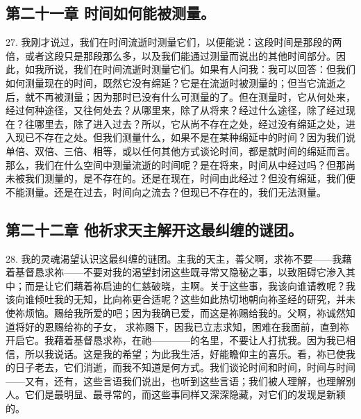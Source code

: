 
\subsection{第二十一章 时间如何能被测量。}

27. 我刚才说过，我们在时间流逝时测量它们，以便能说：这段时间是那段的两倍，或者这段只是那段那么多，以及我们能通过测量而说出的其他时间部分。因此，如我所说，我们在时间流逝时测量它们。如果有人问我：我可以回答：但我们如何测量现在的时间，既然它没有绵延？它是在流逝时被测量的；但当它流逝之后，就不再被测量；因为那时已没有什么可测量的了。但在测量时，它从何处来，经过何种途径，又往何处去？从哪里来，除了从将来？经过什么途径，除了经过现在？往哪里去，除了进入过去？所以，它从尚不存在之处，经过没有绵延之处，进入现已不存在之处。但我们测量什么，如果不是在某种绵延中的时间？因为我们说单倍、双倍、三倍、相等，或以任何其他方式谈论时间，都是就时间的绵延而言。那么，我们在什么空间中测量流逝的时间呢？是在将来，时间从中经过吗？但那尚未被我们测量的，是不存在的。还是在现在，时间由此经过？但没有绵延，我们便不能测量。还是在过去，时间向之流去？但现已不存在的，我们无法测量。\par


\subsection{第二十二章 他祈求天主解开这最纠缠的谜团。}

28. 我的灵魂渴望认识这最纠缠的谜团。主我的天主，善父啊，求祢不要——我藉着基督恳求祢——不要对我的渴望封闭这些既寻常又隐秘之事，以致阻碍它渗入其中；而是让它们藉着祢启迪的仁慈破晓，主啊。关于这些事，我该向谁请教呢？我该向谁倾吐我的无知，比向祢更合适呢？这些如此热切地朝向祢圣经的研究，并未使祢烦恼。赐给我所爱的吧；因为我确已爱，而这是祢赐给我的。父啊，祢诚然知道将好的恩赐给祢的子女， 求祢赐下，因我已立志求知，困难在我面前，直到祢开启它。我藉着基督恳求祢，在祂————的名里，不要让人打扰我。因为我已相信，所以我说话。这是我的希望；为此我生活，好能瞻仰主的喜乐。看，祢已使我的日子老去，它们消逝，而我不知道是何方式。我们谈论时间和时间，时间与时间——又有，还有，这些言语我们说出，也听到这些言语；我们被人理解，也理解别人。它们是最明显、最寻常的，而这些事同样又深深隐藏，对它们的发现是新颖的。\par

